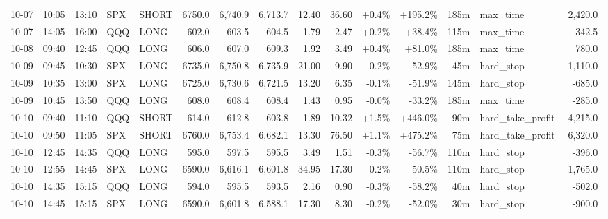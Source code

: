 \documentclass[11pt,a4paper,twoside]{article}
\begin{document}
\begin{landscape}
\begin{center}
\begin{longtable}{>{\color{txtmain}}l l l l l r r r r r r r r >{\color{txtmain}}l r}
10-07 & 10:05 & 13:10 & SPX & SHORT & 6750.0 & 6,740.9 & 6,713.7 & 12.40 & 36.60 & \textcolor{wingreen}{+0.4\%} & \textcolor{wingreen}{+195.2\%} & 185m & max\_time & \textcolor{wingreen}{2,420.0} \\
10-07 & 14:05 & 16:00 & QQQ & LONG & 602.0 & 603.5 & 604.5 & 1.79 & 2.47 & \textcolor{wingreen}{+0.2\%} & \textcolor{wingreen}{+38.4\%} & 115m & max\_time & \textcolor{wingreen}{342.5} \\
10-08 & 09:40 & 12:45 & QQQ & LONG & 606.0 & 607.0 & 609.3 & 1.92 & 3.49 & \textcolor{wingreen}{+0.4\%} & \textcolor{wingreen}{+81.0\%} & 185m & max\_time & \textcolor{wingreen}{780.0} \\
10-09 & 09:45 & 10:30 & SPX & LONG & 6735.0 & 6,750.8 & 6,735.9 & 21.00 & 9.90 & \textcolor{lossred}{-0.2\%} & \textcolor{lossred}{-52.9\%} & 45m & hard\_stop & \textcolor{lossred}{-1,110.0} \\
10-09 & 10:35 & 13:00 & SPX & LONG & 6725.0 & 6,730.6 & 6,721.5 & 13.20 & 6.35 & \textcolor{lossred}{-0.1\%} & \textcolor{lossred}{-51.9\%} & 145m & hard\_stop & \textcolor{lossred}{-685.0} \\
10-09 & 10:45 & 13:50 & QQQ & LONG & 608.0 & 608.4 & 608.4 & 1.43 & 0.95 & \textcolor{lossred}{-0.0\%} & \textcolor{lossred}{-33.2\%} & 185m & max\_time & \textcolor{lossred}{-285.0} \\
10-10 & 09:40 & 11:10 & QQQ & SHORT & 614.0 & 612.8 & 603.8 & 1.89 & 10.32 & \textcolor{wingreen}{+1.5\%} & \textcolor{wingreen}{+446.0\%} & 90m & hard\_take\_profit & \textcolor{wingreen}{4,215.0} \\
10-10 & 09:50 & 11:05 & SPX & SHORT & 6760.0 & 6,753.4 & 6,682.1 & 13.30 & 76.50 & \textcolor{wingreen}{+1.1\%} & \textcolor{wingreen}{+475.2\%} & 75m & hard\_take\_profit & \textcolor{wingreen}{6,320.0} \\
10-10 & 12:45 & 14:35 & QQQ & LONG & 595.0 & 597.5 & 595.5 & 3.49 & 1.51 & \textcolor{lossred}{-0.3\%} & \textcolor{lossred}{-56.7\%} & 110m & hard\_stop & \textcolor{lossred}{-396.0} \\
10-10 & 12:55 & 14:45 & SPX & LONG & 6590.0 & 6,616.1 & 6,601.8 & 34.95 & 17.30 & \textcolor{lossred}{-0.2\%} & \textcolor{lossred}{-50.5\%} & 110m & hard\_stop & \textcolor{lossred}{-1,765.0} \\
10-10 & 14:35 & 15:15 & QQQ & LONG & 594.0 & 595.5 & 593.5 & 2.16 & 0.90 & \textcolor{lossred}{-0.3\%} & \textcolor{lossred}{-58.2\%} & 40m & hard\_stop & \textcolor{lossred}{-502.0} \\
10-10 & 14:45 & 15:15 & SPX & LONG & 6590.0 & 6,601.8 & 6,588.1 & 17.30 & 8.30 & \textcolor{lossred}{-0.2\%} & \textcolor{lossred}{-52.0\%} & 30m & hard\_stop & \textcolor{lossred}{-900.0} \\

\end{longtable}
\end{center}
\end{landscape}
\end{document}
